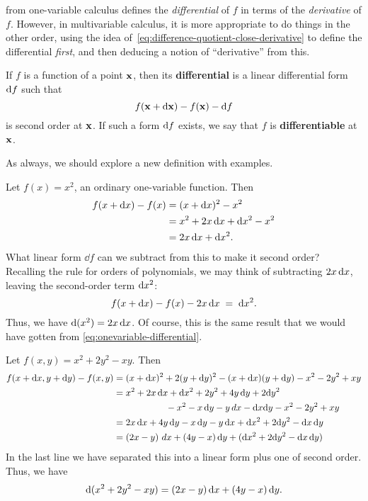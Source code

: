 \documentclass[12pt]{amsart}
\begin{document}
 from one-variable calculus defines the \emph{differential} of $f$ in terms of the \emph{derivative} of $f$.
However, in multivariable calculus, it is more appropriate to do things in the other order, using the idea of~\cref{eq:difference-quotient-close-derivative} to define the differential \emph{first}, and then deducing a notion of ``derivative'' from this.

\begin{defn}\label{def:differential}
  If $f$ is a function of a point $\mathbf{x}$, then its \textbf{differential} is a linear differential form $\mathrm{d} f$ such that
  \[ f(\mathbf{x} + \mathrm{d}\mathbf{x}) - f(\mathbf{x}) - \mathrm{d} f \]
  is second order at $\mathbf{x}$.
  If such a form $\mathrm{d} f$ exists, we say that $f$ is \textbf{differentiable} at $\mathbf{x}$.
\end{defn}

As always, we should explore a new definition with examples.

\begin{eg}
  Let $f(x) = x^2$, an ordinary one-variable function.
  Then
  \begin{align*}
    f(x + \mathrm{d} x) - f(x) &= (x+\mathrm{d} x)^2 - x^2\\
    &= x^2 + 2 x \, \mathrm{d} x + \mathrm{d} x^2 - x^2\\
    &= 2x \, \mathrm{d} x + \mathrm{d} x ^2.
  \end{align*}
  What linear form $\dd f$ can we subtract from this to make it second order?
  Recalling the rule for orders of polynomials, we may think of subtracting $2x \, \mathrm{d} x$, leaving the second-order term $\mathrm{d} x^2$:
  \[ f(x + \mathrm{d} x) - f(x) - 2x \, \mathrm{d} x \;=\; \mathrm{d} x^2. \]
  Thus, we have $\mathrm{d}(x^2) = 2 x \, \mathrm{d} x$.
  Of course, this is the same result that we would have gotten from \cref{eq:onevariable-differential}.
\end{eg}

\begin{eg}
  Let $f(x,y) = x^2 + 2y^2 - xy$.
  Then
  \begin{align*}
    f(x+\mathrm{d} x,y+\mathrm{d} y) - f(x,y)
    &= (x+\mathrm{d} x)^2 + 2(y+\mathrm{d} y)^2 - (x+\mathrm{d} x)(y+\mathrm{d} y) - x^2 - 2y^2 + xy\\
    &= x^2 + 2 x \, \mathrm{d} x + \mathrm{d} x^2 + 2y^2 + 4y\,\mathrm{d} y + 2\mathrm{d} y^2\\
    & \hspace{2cm} - x^2 - x \, \mathrm{d} y - y \, dx - \mathrm{d} x \mathrm{d} y - x^2 - 2y^2 + xy\\
    &= 2x\,\mathrm{d} x + 4y\,\mathrm{d} y - x\,\mathrm{d} y - y\,\mathrm{d} x + \mathrm{d} x^2 + 2\mathrm{d} y^2 - \mathrm{d} x\,\mathrm{d} y\\
    &= (2x-y)\,\,dx + (4y-x)\,\mathrm{d} y + (\mathrm{d} x^2 + 2\mathrm{d} y^2 - \mathrm{d} x\,\mathrm{d} y)
  \end{align*}
  In the last line we have separated this into a linear form plus one of second order.
  Thus, we have
  \[ \mathrm{d}(x^2 + 2y^2 - xy) = (2x-y)\,\mathrm{d} x + (4y-x)\,\mathrm{d} y .\]
\end{eg}
\end{document}
